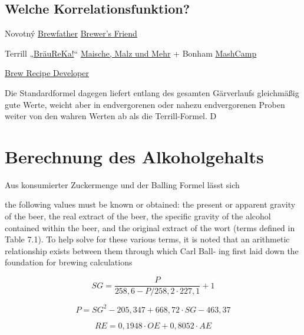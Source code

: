 \documentclass[a4paper,parskip=half]{scrartcl}
\newcommand{\sg}{\mathit{SG}}
\newcommand{\oex}{\mathit{OE}}
\newcommand{\aex}{\mathit{AE}}
\newcommand{\rex}{\mathit{RE}}
\begin{document}

\subsection*{Welche Korrelationsfunktion?}

Novotný
\href{https://brewfather.app}{Brewfather}
\href{https://www.brewersfriend.com/refractometer-calculator}{Brewer's Friend}

Terrill
„\href{https://braureka.de/berechnungen/refraktometer-korrektur/}{BräuReKa!}“
\href{https://www.maischemalzundmehr.de/index.php?inhaltmitte=toolsrefraktorechner}{Maische, Malz und Mehr} + Bonham
\href{https://mashcamp.shop/brauberechnungen}{MashCamp}

\href{http://www.brewrecipedeveloper.de}{Brew Recipe Developer}

Die Standardformel dagegen liefert entlang des gesamten Gärverlaufs gleichmäßig gute Werte, weicht aber in endvergorenen oder nahezu endvergorenen Proben weiter von den wahren Werten ab als die Terrill-Formel. D
\autocite{Weiss2016}

\section*{Berechnung des Alkoholgehalts}

Aus konsumierter Zuckermenge und der Balling Formel lässt sich

the following values must be known or
obtained: the present or apparent gravity of the beer, the real extract of the beer,
the specific gravity of the alcohol contained within the beer, and the original extract
of the wort (terms defined in Table 7.1). To help solve for these various terms, it is
noted that an arithmetic relationship exists between them through which Carl Ball-
ing first laid down the foundation for brewing calculations

\begin{equation}
\sg = \frac{P}{258,6 - \mathit{P} / 258,2 \cdot 227,1} + 1
\end{equation}

\begin{equation}
P = \sg^2 - 205,347 + 668,72 \cdot \sg - 463,37
\end{equation}

\begin{equation}
\rex = 0,1948 \cdot \oex + 0,8052 \cdot \aex
\end{equation}
\end{document}
